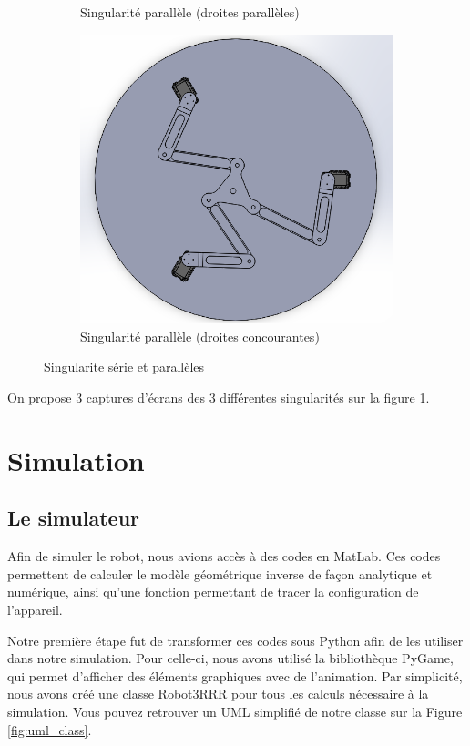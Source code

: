 \documentclass[a4paper, 11pt]{report}
\begin{document}
\begin{figure}[!tbh]
\begin{subfigure}[t]{0.48\textwidth}
        \caption{Singularité parallèle (droites parallèles)}
    \end{subfigure}
    \begin{subfigure}[t]{0.48\textwidth}
        \centering
        \includegraphics[width=\textwidth]{Figures/singularite parallele concourante.png}
        \caption{Singularité parallèle (droites concourantes)}
    \end{subfigure}
    \caption{Singularite série et parallèles}
    \label{fig:singularity}
\end{figure}

On propose 3 captures d'écrans des 3 différentes singularités sur la figure \ref{fig:singularity}.

\section{Simulation}
\subsection{Le simulateur}
Afin de simuler le robot, nous avions accès à des codes en MatLab. Ces codes permettent de calculer le modèle géométrique inverse de façon analytique et numérique, ainsi qu'une fonction permettant de tracer la configuration de l'appareil.

Notre première étape fut de transformer ces codes sous Python afin de les utiliser dans notre simulation. Pour celle-ci, nous avons utilisé la bibliothèque PyGame, qui permet d'afficher des éléments graphiques avec de l'animation. Par simplicité, nous avons créé une classe Robot3RRR pour tous les calculs nécessaire à la simulation. Vous pouvez retrouver un UML simplifié de notre classe sur la Figure \ref{fig:uml_class}.
\end{document}

